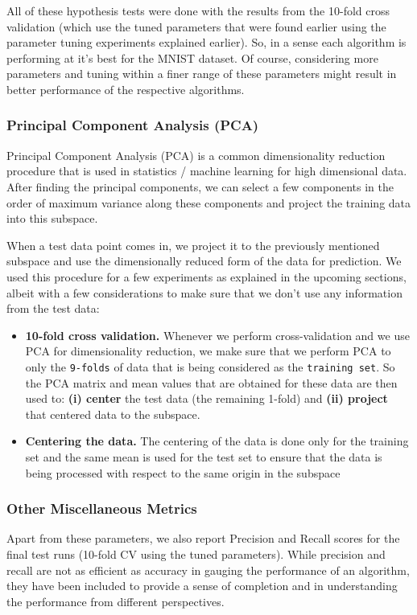 \documentclass[10pt]{scrartcl}
\begin{document}
All of these hypothesis tests were done with the results from the 10-fold cross validation (which use the tuned parameters that were found earlier using the parameter tuning experiments explained earlier). So, in a sense each algorithm is performing at it's best for the MNIST dataset. Of course, considering more parameters and tuning within a finer range of these parameters might result in better performance of the respective algorithms.  

\subsubsection*{Principal Component Analysis (PCA)}
Principal Component Analysis (PCA) is a common dimensionality reduction procedure that is used in statistics / machine learning for high dimensional data. After finding the principal components, we can select a few components in the order of maximum variance along these components and project the training data into this subspace.

When a test data point comes in, we project it to the previously mentioned subspace and use the dimensionally reduced form of the data for prediction. We used this procedure for a few experiments as explained in the upcoming sections, albeit with a few considerations to make sure that we don't use any information from the test data:

\begin{itemize}
\item{\textbf{10-fold cross validation.}} Whenever we perform cross-validation and we use PCA for dimensionality reduction, we make sure that we perform PCA to only the \texttt{9-folds} of data that is being considered as the \texttt{training set}. So the PCA matrix and mean values that are obtained for these data are then used to: \textbf{(i) center} the test data (the remaining 1-fold) and \textbf{(ii) project} that centered data to the subspace.

\item{\textbf{Centering the data.}} The centering of the data is done only for the training set and the same mean is used for the test set to ensure that the data is being processed with respect to the same origin in the subspace
\end{itemize}
 
\subsubsection*{Other Miscellaneous Metrics} 
Apart from these parameters, we also report Precision and Recall scores for the final test runs (10-fold CV using the tuned parameters). While precision and recall are not as efficient as accuracy in gauging the performance of an algorithm, they have been included to provide a sense of completion and in understanding the performance from different perspectives. 
\end{document}
